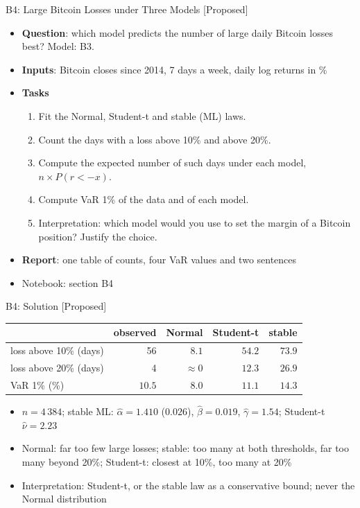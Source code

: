 \begin{frame}{B4: Large Bitcoin Losses under Three Models [Proposed]}
\itemsize{\scriptsize}
\begin{itemize}
\item \textbf{Question}: which model predicts the number of large daily Bitcoin losses best? Model: B3.
\item \textbf{Inputs}: Bitcoin closes since 2014, 7 days a week, daily log returns in \%
\item \textbf{Tasks}
\begin{enumerate}
    \item Fit the Normal, Student-t and stable (ML) laws.
    \item Count the days with a loss above 10\% and above 20\%.
    \item Compute the expected number of such days under each model, $n \times P(r < -x)$.
    \item Compute VaR 1\% of the data and of each model.
    \item Interpretation: which model would you use to set the margin of a Bitcoin position? Justify the choice.
\end{enumerate}
\item \textbf{Report}: one table of counts, four VaR values and two sentences
\item Notebook: section B4
\end{itemize}
\end{frame}

\ifsolutions
\begin{frame}{B4: Solution [Proposed]}
\itemsize{\footnotesize}
\begin{center}
\footnotesize
\begin{tabular}{lrrrr}
\toprule
& observed & Normal & Student-t & stable \\
\midrule
loss above 10\% (days) & 56 & $8.1$ & $54.2$ & $73.9$ \\
loss above 20\% (days) & 4 & $\approx 0$ & $12.3$ & $26.9$ \\
VaR 1\% (\%) & $10.5$ & $8.0$ & $11.1$ & $14.3$ \\
\bottomrule
\end{tabular}
\end{center}
\begin{itemize}
    \item $n = 4\,384$; stable ML: $\hat\alpha = 1.410$ ($0.026$), $\hat\beta = 0.019$, $\hat\gamma = 1.54$; Student-t $\hat\nu = 2.23$
    \item Normal: far too few large losses; stable: too many at both thresholds, far too many beyond 20\%; Student-t: closest at 10\%, too many at 20\%
    \item Interpretation: Student-t, or the stable law as a conservative bound; never the Normal distribution
\end{itemize}
\end{frame}
\fi

